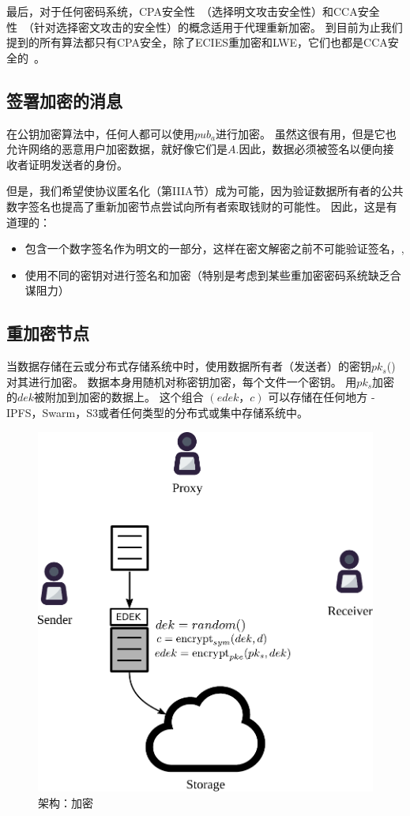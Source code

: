 \documentclass[longbibliography,nofootinbib]{revtex4-1}
\begin{document}
最后，对于任何密码系统，CPA安全性~\cite{wiki:cpa}（选择明文攻击安全性）和CCA安全性~\cite{wiki:cca}（针对选择密文攻击的安全性）的概念适用于代理重新加密。 到目前为止我们提到的所有算法都只有CPA安全，除了ECIES重加密和LWE，它们也都是CCA安全的~\cite{lwe-reencryption}。


\subsection{签署加密的消息}

    在公钥加密算法中，任何人都可以使用$pub_a$进行加密。 虽然这很有用，但是它也允许网络的恶意用户加密数据，就好像它们是$A$.因此，数据必须被签名以便向接收者证明发送者的身份。
    
    但是，我们希望使协议匿名化（第IIIA节）成为可能，因为验证数据所有者的公共数字签名也提高了重新加密节点尝试向所有者索取钱财的可能性。 因此，这是有道理的：

\begin{itemize}
    \item 包含一个数字签名作为明文的一部分，这样在密文解密之前不可能验证签名，,
    \item 使用不同的密钥对进行签名和加密（特别是考虑到某些重加密密码系统缺乏合谋阻力）
\end{itemize}

\subsection{重加密节点}

当数据存储在云或分布式存储系统中时，使用数据所有者（发送者）的密钥$pk_s$() 对其进行加密。 数据本身用随机对称密钥加密，每个文件一个密钥。 用$pk_s$加密的$dek$被附加到加密的数据上。 这个组合 $(edek，c)$ 可以存储在任何地方 - IPFS，Swarm，S3或者任何类型的分布式或集中存储系统中。

\begin{figure}
\centering
    \includegraphics[width=0.4\columnwidth]{pdf/encrypt.pdf}
    \caption{架构：加密}
    \label{fig:arch-encrypt}
\end{figure}
\end{document}
